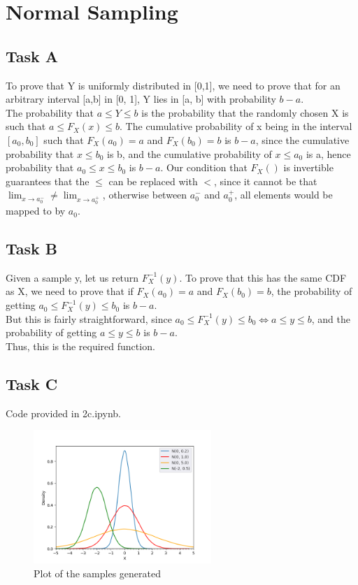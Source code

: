 \section{Normal Sampling}
\subsection{Task A}
To prove that Y is uniformly distributed in [0,1], we need to prove that for an arbitrary interval [a,b] in [0, 1], Y lies in [a, b] with probability $b-a$.\\
The probability that $a \le Y \le b$ is the probability that the randomly chosen X is such that $a \le F_X(x) \le b$. The cumulative probability of x being in the interval $[a_0, b_0]$ such that $F_X(a_0) = a$ and $F_X(b_0) = b$ is $b-a$, since the cumulative probability that $x \le b_0$ is b, and the cumulative probability of $x\le a_0$ is a, hence probability that $a_0 \le x \le b_0$ is $b-a$. Our condition that $F_X()$ is invertible guarantees that the $\le$ can be replaced with $<$, since it cannot be that $\lim_{x\to a_0^-} \ne \lim_{x\to a_0^+}$, otherwise between $a_0^-$ and $a_0^+$, all elements would be mapped to by $a_0$.

\subsection{Task B}
Given a sample y, let us return $F_X^{-1}(y)$. To prove that this has the same CDF as X, we need to prove that if $F_X(a_0)=a$ and $F_X(b_0)=b$, the probability of getting $a_0 \le F_X^{-1}(y) \le b_0$ is $b-a$.\\
But this is fairly straightforward, since $a_0 \le F_X^{-1}(y) \le b_0 \iff a \le y \le b$, and the probability of getting $a \le y \le b$ is $b-a$.\\
Thus, this is the required function.

\subsection{Task C}
Code provided in 2c.ipynb.
\begin{figure}[H]
    \centering
    \includegraphics[width=0.6\textwidth]{../images/2c.png}
    \caption{Plot of the samples generated}
    \label{fig:2c}
\end{figure}

